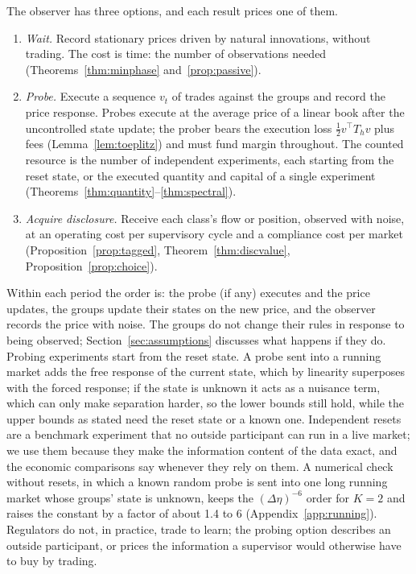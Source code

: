 \documentclass[12pt]{article}
\theoremstyle{definition}
\theoremstyle{remark}
\begin{document}
The observer has three options, and each result prices one of them.
\begin{enumerate}[label=(\alph*),itemsep=1pt]
\item \emph{Wait.} Record stationary prices driven by natural innovations, without trading. The cost is time: the number of observations needed (Theorems~\ref{thm:minphase} and~\ref{prop:passive}).
\item \emph{Probe.} Execute a sequence $v_t$ of trades against the groups and record the price response. Probes execute at the average price of a linear book after the uncontrolled state update; the prober bears the execution loss $\tfrac12v^\top T_hv$ plus fees (Lemma~\ref{lem:toeplitz}) and must fund margin throughout. The counted resource is the number of independent experiments, each starting from the reset state, or the executed quantity and capital of a single experiment (Theorems~\ref{thm:quantity}--\ref{thm:spectral}).
\item \emph{Acquire disclosure.} Receive each class's flow or position, observed with noise, at an operating cost per supervisory cycle and a compliance cost per market (Proposition~\ref{prop:tagged}, Theorem~\ref{thm:discvalue}, Proposition~\ref{prop:choice}).
\end{enumerate}
Within each period the order is: the probe (if any) executes and the price updates, the groups update their states on the new price, and the observer records the price with noise. The groups do not change their rules in response to being observed; Section~\ref{sec:assumptions} discusses what happens if they do. Probing experiments start from the reset state. A probe sent into a running market adds the free response of the current state, which by linearity superposes with the forced response; if the state is unknown it acts as a nuisance term, which can only make separation harder, so the lower bounds still hold, while the upper bounds as stated need the reset state or a known one. Independent resets are a benchmark experiment that no outside participant can run in a live market; we use them because they make the information content of the data exact, and the economic comparisons say whenever they rely on them. A numerical check without resets, in which a known random probe is sent into one long running market whose groups' state is unknown, keeps the $(\Delta\eta)^{-6}$ order for $K=2$ and raises the constant by a factor of about 1.4 to 6 (Appendix~\ref{app:running}). Regulators do not, in practice, trade to learn; the probing option describes an outside participant, or prices the information a supervisor would otherwise have to buy by trading.
\end{document}
